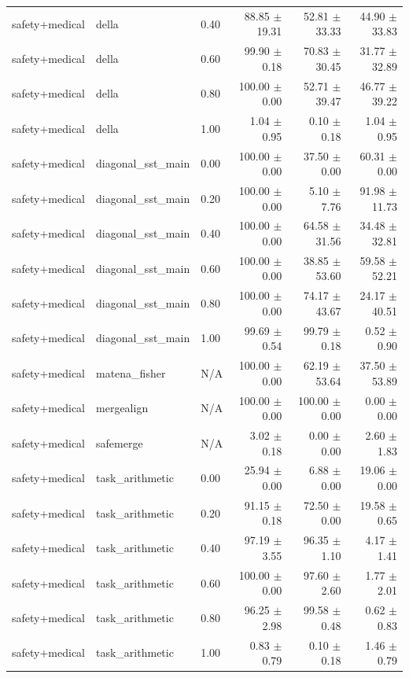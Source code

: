 \documentclass{article}
\begin{document}
\begin{table}[H]
{\begin{tabular}{lllrrr}
safety+medical & della & 0.40 & 88.85 $\pm$ 19.31 & 52.81 $\pm$ 33.33 & 44.90 $\pm$ 33.83 \\
safety+medical & della & 0.60 & 99.90 $\pm$ 0.18 & 70.83 $\pm$ 30.45 & 31.77 $\pm$ 32.89 \\
safety+medical & della & 0.80 & 100.00 $\pm$ 0.00 & 52.71 $\pm$ 39.47 & 46.77 $\pm$ 39.22 \\
safety+medical & della & 1.00 & 1.04 $\pm$ 0.95 & 0.10 $\pm$ 0.18 & 1.04 $\pm$ 0.95 \\
safety+medical & diagonal\_sst\_main & 0.00 & 100.00 $\pm$ 0.00 & 37.50 $\pm$ 0.00 & 60.31 $\pm$ 0.00 \\
safety+medical & diagonal\_sst\_main & 0.20 & 100.00 $\pm$ 0.00 & 5.10 $\pm$ 7.76 & 91.98 $\pm$ 11.73 \\
safety+medical & diagonal\_sst\_main & 0.40 & 100.00 $\pm$ 0.00 & 64.58 $\pm$ 31.56 & 34.48 $\pm$ 32.81 \\
safety+medical & diagonal\_sst\_main & 0.60 & 100.00 $\pm$ 0.00 & 38.85 $\pm$ 53.60 & 59.58 $\pm$ 52.21 \\
safety+medical & diagonal\_sst\_main & 0.80 & 100.00 $\pm$ 0.00 & 74.17 $\pm$ 43.67 & 24.17 $\pm$ 40.51 \\
safety+medical & diagonal\_sst\_main & 1.00 & 99.69 $\pm$ 0.54 & 99.79 $\pm$ 0.18 & 0.52 $\pm$ 0.90 \\
safety+medical & matena\_fisher & N/A & 100.00 $\pm$ 0.00 & 62.19 $\pm$ 53.64 & 37.50 $\pm$ 53.89 \\
safety+medical & mergealign & N/A & 100.00 $\pm$ 0.00 & 100.00 $\pm$ 0.00 & 0.00 $\pm$ 0.00 \\
safety+medical & safemerge & N/A & 3.02 $\pm$ 0.18 & 0.00 $\pm$ 0.00 & 2.60 $\pm$ 1.83 \\
safety+medical & task\_arithmetic & 0.00 & 25.94 $\pm$ 0.00 & 6.88 $\pm$ 0.00 & 19.06 $\pm$ 0.00 \\
safety+medical & task\_arithmetic & 0.20 & 91.15 $\pm$ 0.18 & 72.50 $\pm$ 0.00 & 19.58 $\pm$ 0.65 \\
safety+medical & task\_arithmetic & 0.40 & 97.19 $\pm$ 3.55 & 96.35 $\pm$ 1.10 & 4.17 $\pm$ 1.41 \\
safety+medical & task\_arithmetic & 0.60 & 100.00 $\pm$ 0.00 & 97.60 $\pm$ 2.60 & 1.77 $\pm$ 2.01 \\
safety+medical & task\_arithmetic & 0.80 & 96.25 $\pm$ 2.98 & 99.58 $\pm$ 0.48 & 0.62 $\pm$ 0.83 \\
safety+medical & task\_arithmetic & 1.00 & 0.83 $\pm$ 0.79 & 0.10 $\pm$ 0.18 & 1.46 $\pm$ 0.79 \\

\end{tabular}}
\end{table}
\end{document}
